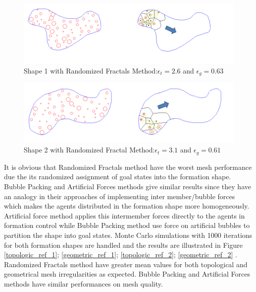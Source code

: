 \begin{figure}[H]
\caption{Shape 1 with Randomized Fractals Method:$\epsilon_t = 2.6$ and $\epsilon_g = 0.63$}
\centerline{\includegraphics[scale = 0.70]{Randomized_Fractals_Mesh_1}}
\end{figure} 	

\begin{figure}[H]
\caption{Shape 2 with Randomized Fractal Method:$\epsilon_t = 3.1$ and $\epsilon_g = 0.61$}
\centerline{\includegraphics[scale = 0.65]{Randomized_Fractals_Mesh_2}}
\end{figure} 	

It is obvious that Randomized Fractals method have the worst mesh performance due the its randomized assignment of goal states into the formation shape. Bubble Packing and Artificial Forces methods give similar results since they have an analogy in their approaches of implementing inter member/bubble forces which makes the agents distributed in the formation shape more homogeneously. Artificial force method applies this intermember forces directly to the agents in formation control while Bubble Packing method use force on artificial bubbles to partition the shape into goal states. Monte Carlo simulations with 1000 iterations for both formation shapes are handled and the results are illustrated in Figure \ref{topologic_ref_1}; \ref{geometric_ref_1}; \ref{topologic_ref_2}; \ref{geometric_ref_2} . Randomized Fractals method have greater mean values for both topological and geometrical mesh irregularities as expected.  Bubble Packing and Artificial Forces methods have similar performances on mesh quality.
		
